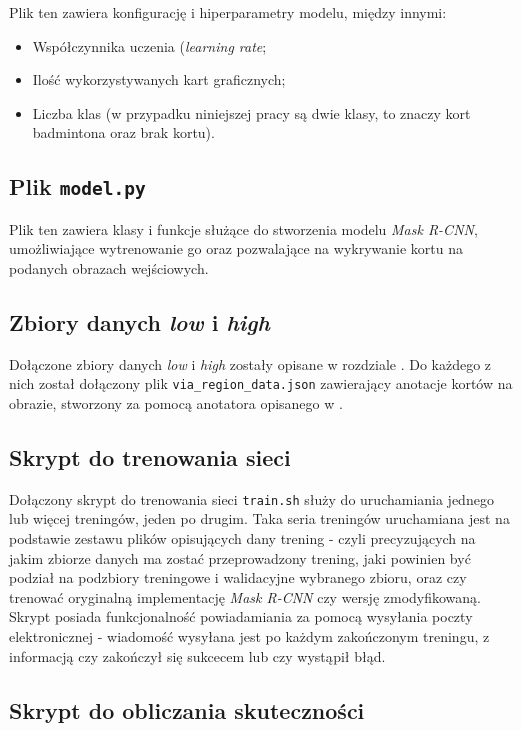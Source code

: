 Plik ten zawiera konfigurację i hiperparametry modelu, między innymi:
\begin{itemize}
  \item Współczynnika uczenia (\textit{learning rate};
  \item Ilość wykorzystywanych kart graficznych;
  \item Liczba klas (w przypadku niniejszej pracy są dwie klasy, to znaczy kort badmintona oraz brak kortu).
\end{itemize}

\subsection*{Plik \texttt{model.py}}

Plik ten zawiera klasy i funkcje służące do stworzenia modelu \textit{Mask R-CNN}, umożliwiające wytrenowanie go oraz pozwalające na wykrywanie kortu na podanych obrazach wejściowych.

\subsection*{Zbiory danych \textit{low} i \textit{high}}

Dołączone zbiory danych \textit{low} i \textit{high} zostały opisane w rozdziale .
Do każdego z nich został dołączony plik \texttt{via\_region\_data.json} zawierający anotacje kortów na obrazie, stworzony za pomocą anotatora opisanego w .

\subsection*{Skrypt do trenowania sieci}

Dołączony skrypt do trenowania sieci \texttt{train.sh} służy do uruchamiania jednego lub więcej treningów, jeden po drugim. Taka seria treningów uruchamiana jest na podstawie zestawu plików opisujących dany trening - czyli precyzujących na jakim zbiorze danych ma zostać przeprowadzony trening, jaki powinien być podział na podzbiory treningowe i walidacyjne wybranego zbioru, oraz czy trenować oryginalną implementację \textit{Mask R-CNN} czy wersję zmodyfikowaną. Skrypt posiada funkcjonalność powiadamiania za pomocą wysyłania poczty elektronicznej - wiadomość wysyłana jest po każdym zakończonym treningu, z informacją czy zakończył się sukcecem lub czy wystąpił błąd.

\subsection*{Skrypt do obliczania skuteczności}


